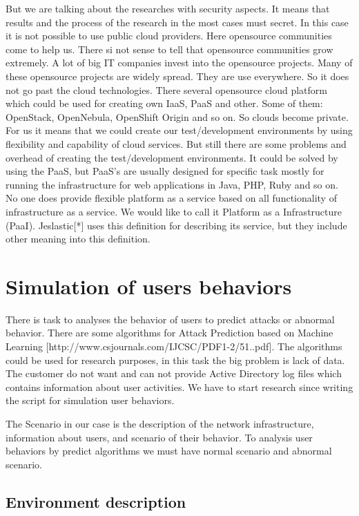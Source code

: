 \documentclass{article}
\begin{document}
But we are talking about the researches with security aspects. It means that results and the process of the research in the most cases must secret. In this case it is not possible to use public cloud providers. Here opensource communities come to help us. There si not sense to tell that opensource communities grow extremely. A lot of big IT companies invest into the opensource projects. Many of these opensource projects are widely spread. They are use everywhere. So it does not go past the cloud technologies. There several opensource cloud platform which could be used for creating own IaaS, PaaS and other. Some of them: OpenStack, OpenNebula,  OpenShift Origin and so on. So clouds become private. For us it means that we could create our test/development environments by using flexibility and capability of cloud services. But still there are some problems and overhead of creating the test/development environments. It could be solved by using the PaaS, but PaaS's are usually designed for specific task mostly for running the infrastructure for web applications in Java, PHP, Ruby and so on. No one does provide flexible platform as a service based on all functionality of infrastructure as a service. We would like to call it Platform as a Infrastructure (PaaI). Jeslastic[*] uses this definition for describing its service, but they include other meaning into this definition.     

        


\section{Simulation of users behaviors}
There is task to analyses the behavior of users to predict attacks or abnormal behavior. There are some algorithms for Attack Prediction based on Machine Learning [http://www.csjournals.com/IJCSC/PDF1-2/51..pdf]. The algorithms could be used for research purposes, in this task the big problem is lack of data. The customer do not want and can not provide Active Directory log files which contains information about user activities. We have to start research since writing the script for simulation user behaviors. 

The Scenario in our case is the description of the network infrastructure, information about users, and scenario of their behavior. To analysis user behaviors by predict algorithms we must have normal scenario and abnormal scenario.  
  
\subsection{Environment description}
\end{document}
